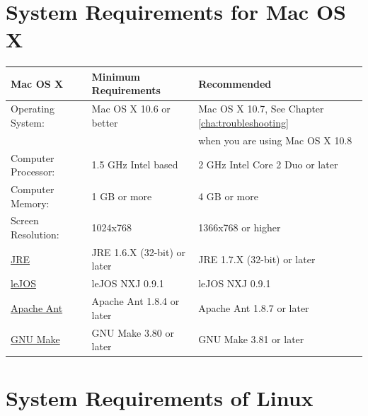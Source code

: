 \documentclass[11pt, a4paper]{report}
\begin{document}
\section{System Requirements for Mac OS X} %
\label{sec:system_requirements_for_mac_os_x}
\begin{tabular}{| l | l | l | }
\hline
Mac OS X				& Minimum Requirements									& Recommended				 			 	\\ \hline
Operating System:		& Mac OS X 10.6 or better								& Mac OS X 10.7, See Chapter \ref{cha:troubleshooting}	\\ 
						&														& when you are using Mac OS X 10.8			\\ \hline
Computer Processor:		& 1.5 GHz Intel based									& 2 GHz Intel Core 2 Duo or later 			\\ \hline
Computer Memory:		& 1 GB or more											& 4 GB or more								\\ \hline
Screen Resolution:		& 1024x768												& 1366x768 or higher						\\ \hline
\href{http://www.oracle.com/technetwork/java/javase/downloads/index.html}{JRE}
						& JRE 1.6.X (32-bit) or later							& JRE 1.7.X (32-bit) or later				\\ \hline
\href{http://lejos.sourceforge.net}{leJOS}
	 					& leJOS NXJ 0.9.1										& leJOS NXJ 0.9.1							\\ \hline
\href{http://ant.apache.org}{Apache Ant}
		 				& Apache Ant 1.8.4 or later 							& Apache Ant 1.8.7 or later 				\\ \hline
\href{http://www.gnu.org/software/make/}{GNU Make}   				
						& GNU Make 3.80 or later 								& GNU Make 3.81 or later 					\\ \hline
\end{tabular}

\section{System Requirements of Linux} %
\label{sec:system_requirements_of_linux}
\end{document}
